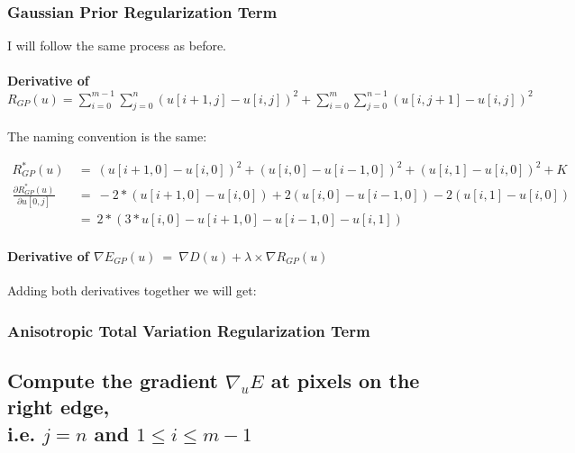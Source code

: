 \documentclass{report}
\begin{document}
			\subsubsection{Gaussian Prior Regularization Term}
			\startsubsection
				I will follow the same process as before.
				\vspace{-0.4cm} \paragraph{Derivative of $R_{GP}(u) = \sum_{i=0}^{m-1} \sum_{j=0}^{n} ( u[i+1,j] - u[i,j] )^2 + \sum_{i=0}^{m} \sum_{j=0}^{n-1} ( u[i,j+1] - u[i,j] )^2$}
				\startsubsection
					\vspace{0.2cm} The naming convention is the same:
				\closesection
				\begin{adjustwidth}{-4em}{}
					\vspace{-0.5cm}
					\begin{align*}
						R_{GP}^*(u) \ & = \ (u[i+1,0] - u[i,0])^2 + (u[i,0] - u[i-1,0])^2 + (u[i,1] - u[i,0])^2 + K \\
						\frac{\partial R_{GP}^*(u)}{\partial u[0,j]} \ & = \ -2 * (u[i+1,0] - u[i,0]) + 2 (u[i,0] - u[i-1,0]) - 2 (u[i,1] - u[i,0]) \\
						& = \ 2 * (3 * u[i,0] - u[i+1,0] - u[i-1,0] - u[i,1])
					\end{align*}
				\end{adjustwidth}
				\vspace{-0.4cm} \paragraph{Derivative of $\nabla E_{GP}(u) \ = \ \nabla D(u) + \lambda \times \nabla R_{GP}(u)$}
				\startsubsection
					Adding both derivatives together we will get:
				\closesection
			\closesection
			\subsubsection{Anisotropic Total Variation Regularization Term}
			\startsubsection
			\closesection
		\closesection
		
		\subsection{Compute the gradient $\nabla_u E$ at pixels on the right edge, \\ i.e. $j = n$ and $1 \leq i \leq m-1$}
		\startsubsection
\end{document}
